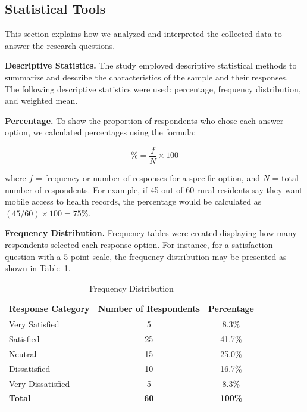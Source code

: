 \documentclass{research}
\begin{document}
\subsection*{Statistical Tools}

This section explains how we analyzed and interpreted the collected data to answer the research
questions.

\textbf{Descriptive Statistics.} The study employed descriptive statistical methods to summarize
and describe the characteristics of the sample and their responses. The following descriptive
statistics were used: percentage, frequency distribution, and weighted mean.

\textbf{Percentage.} To show the proportion of respondents who chose each answer option, we
calculated percentages using the formula:

\begin{equation}
  \% = \frac{f}{N} \times 100
  \label{eq:percentage}
\end{equation}

\noindent where $f$ = frequency or number of responses for a specific option, and $N$ = total
number of respondents. For example, if 45 out of 60 rural residents say they want mobile access
to health records, the percentage would be calculated as $(45/60) \times 100 = 75\%$.

\textbf{Frequency Distribution.} Frequency tables were created displaying how many respondents
selected each response option. For instance, for a satisfaction question with a 5-point scale,
the frequency distribution may be presented as shown in Table~\ref{tab:freq}.

\begin{table}[H]
  \centering
  \caption{Frequency Distribution}
  \label{tab:freq}
  \begin{tabular}{lcc}
    \toprule
    \textbf{Response Category} & \textbf{Number of Respondents} & \textbf{Percentage} \\
    \midrule
    Very Satisfied    & 5  & 8.3\%  \\
    Satisfied         & 25 & 41.7\% \\
    Neutral           & 15 & 25.0\% \\
    Dissatisfied      & 10 & 16.7\% \\
    Very Dissatisfied & 5  & 8.3\%  \\
    \midrule
    \textbf{Total}    & \textbf{60} & \textbf{100\%} \\
    \bottomrule
  \end{tabular}
\end{table}
\end{document}

